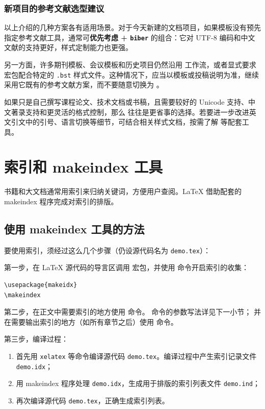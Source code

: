 \subsubsection{新项目的参考文献选型建议}

以上介绍的几种方案各有适用场景。对于今天新建的文档项目，如果模板没有预先指定参考文献工具，通常可\textbf{优先考虑
 + \texttt{biber}} 的组合：它对 UTF-8 编码和中文文献的支持更好，样式定制能力也更强。

另一方面，许多期刊模板、会议模板和历史项目仍然沿用  工作流，或者显式要求  宏包配合特定的 \texttt{.bst}
样式文件。这种情况下，应当以模板或投稿说明为准，继续采用它既有的参考文献方案，而不要随意切换为 。

如果只是自己撰写课程论文、技术文档或书稿，且需要较好的 Unicode 支持、中文著录支持和更灵活的格式控制，那么 
往往是更省事的选择。若要进一步改进英文引文中的引号、语言切换等细节，可结合相关样式文档，按需了解  等配套工具。

\section{索引和 makeindex 工具}\label{sec:index}

书籍和大文档通常用索引来归纳关键词，方便用户查阅。\LaTeX{} 借助配套的 makeindex 程序完成对索引的排版。

\subsection{使用 makeindex 工具的方法}\label{subsec:makeidx}

要使用索引，须经过这么几个步骤（仍设源代码名为 \texttt{demo.tex}）：

第一步，在 \LaTeX{} 源代码的导言区调用  宏包，并使用  命令开启索引的收集：
\begin{verbatim}
\usepackage{makeidx}
\makeindex
\end{verbatim}

第二步，在正文中需要索引的地方使用  命令。 命令的参数写法详见下一小节；
并在需要输出索引的地方（如所有章节之后）使用  命令。

第三步，编译过程：

\begin{enumerate}
  \item 首先用 \texttt{xelatex} 等命令编译源代码 \texttt{demo.tex}。编译过程中产生索引记录文件 \texttt{demo.idx}；
  \item 用 makeindex 程序处理 \texttt{demo.idx}，生成用于排版的索引列表文件 \texttt{demo.ind}；
  \item 再次编译源代码 \texttt{demo.tex}，正确生成索引列表。
\end{enumerate}

